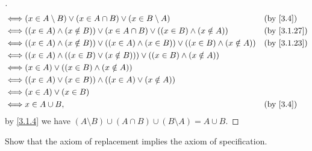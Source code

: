 \begin{proof}[]
\begin{align*}
    \iff & (x \in A \setminus B) \lor (x \in A \cap B) \lor (x \in B \setminus A)                              &  & \by{3.4}    \\
    \iff & ((x \in A) \land (x \notin B)) \lor (x \in A \cap B) \lor ((x \in B) \land (x \notin A))            &  & \by{3.1.27} \\
    \iff & ((x \in A) \land (x \notin B)) \lor ((x \in A) \land (x \in B)) \lor ((x \in B) \land (x \notin A)) &  & \by{3.1.23} \\
    \iff & ((x \in A) \land ((x \in B) \lor (x \notin B))) \lor ((x \in B) \land (x \notin A))                                  \\
    \iff & (x \in A) \lor ((x \in B) \land (x \notin A))                                                                        \\
    \iff & ((x \in A) \lor (x \in B)) \land ((x \in A) \lor (x \notin A))                                                       \\
    \iff & (x \in A) \lor (x \in B)                                                                                             \\
    \iff & x \in A \cup B,                                                                                     &  & \by{3.4}
  \end{align*}
  by \cref{3.1.4} we have \((A \setminus B) \cup (A \cap B) \cup (B \setminus A) = A \cup B\).
\end{proof}

\begin{ex}\label{ex:3.1.11}
  Show that the axiom of replacement implies the axiom of specification.
\end{ex}

